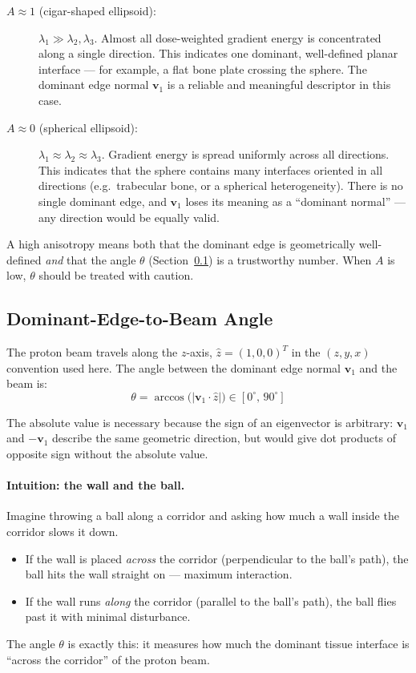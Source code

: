 \documentclass[11pt,a4paper]{article}
\newcommand{\vv}{\mathbf{v}}
\begin{document}
\begin{description}
    \item[$A \approx 1$ (cigar-shaped ellipsoid):]
        $\lambda_1 \gg \lambda_2, \lambda_3$.
        Almost all dose-weighted gradient energy is concentrated along a
        single direction.
        This indicates one dominant, well-defined planar interface — for
        example, a flat bone plate crossing the sphere.
        The dominant edge normal $\vv_1$ is a reliable and meaningful
        descriptor in this case.

    \item[$A \approx 0$ (spherical ellipsoid):]
        $\lambda_1 \approx \lambda_2 \approx \lambda_3$.
        Gradient energy is spread uniformly across all directions.
        This indicates that the sphere contains many interfaces oriented in
        all directions (e.g.\ trabecular bone, or a spherical heterogeneity).
        There is no single dominant edge, and $\vv_1$ loses its meaning as a
        ``dominant normal'' — any direction would be equally valid.
\end{description}

A high anisotropy means both that the dominant edge is geometrically
well-defined \emph{and} that the angle $\theta$ (Section~\ref{sec:angle})
is a trustworthy number.
When $A$ is low, $\theta$ should be treated with caution.

\subsection{Dominant-Edge-to-Beam Angle}
\label{sec:angle}

The proton beam travels along the $z$-axis,
$\hat{z} = (1,0,0)^T$ in the $(z,y,x)$ convention used here.
The angle between the dominant edge normal $\vv_1$ and the beam is:
\begin{equation}
    \boxed{\theta = \arccos\!\bigl(|\vv_1 \cdot \hat{z}|\bigr)}
    \in [0^\circ,\,90^\circ]
    \label{eq:beam_angle}
\end{equation}

The absolute value is necessary because the sign of an eigenvector is
arbitrary: $\vv_1$ and $-\vv_1$ describe the same geometric direction, but
would give dot products of opposite sign without the absolute value.

\paragraph{Intuition: the wall and the ball.}
Imagine throwing a ball along a corridor and asking how much a wall inside
the corridor slows it down.
\begin{itemize}
    \item If the wall is placed \emph{across} the corridor (perpendicular to
          the ball's path), the ball hits the wall straight on — maximum
          interaction.
    \item If the wall runs \emph{along} the corridor (parallel to the ball's
          path), the ball flies past it with minimal disturbance.
\end{itemize}
The angle $\theta$ is exactly this: it measures how much the dominant tissue
interface is ``across the corridor'' of the proton beam.
\end{document}

